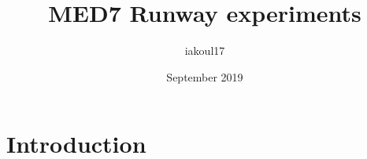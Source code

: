 \documentclass{article}
\title{MED7 Runway experiments}
\author{iakoul17 }
\date{September 2019}
\begin{document}
\maketitle
\begin{abstract}
    
\end{abstract}
\section{Introduction}
\end{document}
